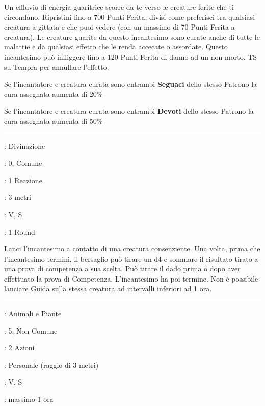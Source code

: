 \begin{multicols}{2}
Un effluvio di energia guaritrice scorre da te verso le creature ferite che ti circondano. Ripristini fino a 700 Punti Ferita, divisi come preferisci tra qualsiasi creatura a gittata e che puoi vedere (con un massimo di 70 Punti Ferita a creatura). Le creature guarite da questo incantesimo sono curate anche di tutte le malattie e da qualsiasi effetto che le renda accecate o assordate. Questo incantesimo può infliggere fino a 120 Punti Ferita di danno ad un non morto. TS su Tempra per annullare l'effetto.

Se l'incantatore e creatura curata sono entrambi \textbf{Seguaci} dello stesso Patrono la cura assegnata aumenta di 20\%

Se l'incantatore e creatura curata sono entrambi \textbf{Devoti} dello stesso Patrono la cura assegnata aumenta di 50\%

\smallskip\noindent\rule{\linewidth}{2pt} \hypertarget{Guida}{}\smallskip{}
\noindent
\begin{description}[noitemsep, topsep=0pt, parsep=0pt, partopsep=0pt, leftmargin=0cm, labelwidth=2.8cm]
	\item[\textbf{Lista di Magia}]: Divinazione
	\item[\textbf{Livello}]: 0, Comune
	\item[\textbf{T. di Lancio}]: 1 Reazione
	\item[\textbf{Gittata}]: 3 metri
	\item[\textbf{Componenti}]: V, S
	\item[\textbf{Durata}]: 1 Round
\end{description}

Lanci l'incantesimo a contatto di una creatura consenziente. Una volta, prima che l'incantesimo termini, il bersaglio può tirare un d4 e sommare il risultato tirato a una prova di competenza a sua scelta. Può tirare il dado prima o dopo aver effettuato la prova di Competenza. L'incantesimo ha poi termine. Non è possibile lanciare Guida sulla stessa creatura ad intervalli inferiori ad 1 ora.

\smallskip\noindent\rule{\linewidth}{2pt} \hypertarget{Guscio Anti-Vita}{}\smallskip{}
\noindent
\begin{description}[noitemsep, topsep=0pt, parsep=0pt, partopsep=0pt, leftmargin=0cm, labelwidth=2.8cm]
	\item[\textbf{Lista di Magia}]: Animali e Piante
	\item[\textbf{Livello}]: 5, Non Comune
	\item[\textbf{T. di Lancio}]: 2 Azioni
	\item[\textbf{Gittata}]: Personale (raggio di 3 metri)
	\item[\textbf{Componenti}]: V, S
	\item[\textbf{Durata}]: massimo 1 ora
\end{description}


\end{multicols}
